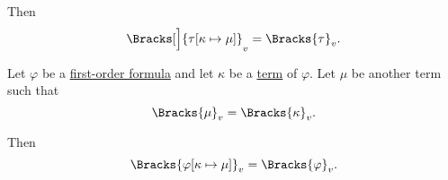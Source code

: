 \begin{proposition}
\begin{thmenum}
    Then
    \begin{equation}\label{eq:thm:first_order_substitution_equivalence/term_in_term}
      \Bracks[\Big]{\tau[\kappa \mapsto \mu]}_v = \Bracks{\tau}_v.
    \end{equation}

     Let \( \varphi \) be a \hyperref[def:first_order_syntax/formula]{first-order formula} and let \( \kappa \) be a \hyperref[def:first_order_syntax/formula_terms]{term} of \( \varphi \). Let \( \mu \) be another term such that
    \begin{equation}\label{eq:thm:first_order_substitution_equivalence/term_in_formula/compatibility}
      \Bracks{\mu}_v = \Bracks{\kappa}_v.
    \end{equation}

    Then
    \begin{equation}\label{eq:thm:first_order_substitution_equivalence/term_in_formula}
      \Bracks{\varphi[\kappa \mapsto \mu]}_v = \Bracks{\varphi}_v.
    \end{equation}
  \end{thmenum}
\end{proposition}
